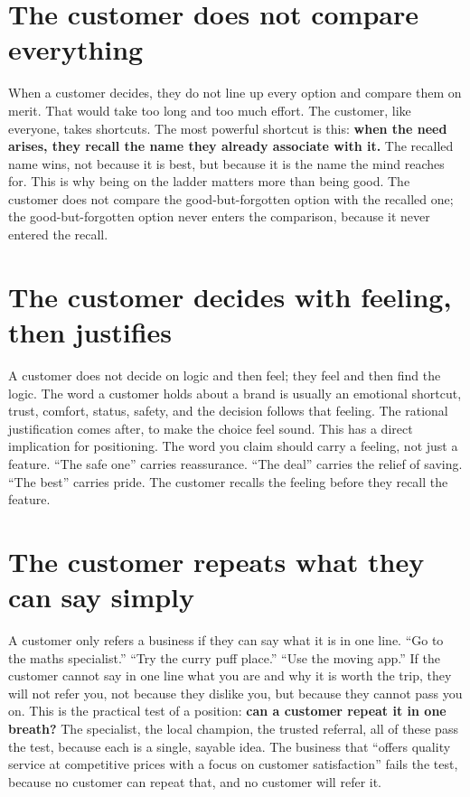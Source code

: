 \documentclass[10pt,twoside,openany]{memoir}
\newcommand{\needspacehead}{\needspace{4\baselineskip}}
\let\oldsection\section
\renewcommand{\section}{\needspacehead\oldsection}
\begin{document}
\section{The customer does not compare
everything}\label{the-customer-does-not-compare-everything}

When a customer decides, they do not line up every option and compare
them on merit. That would take too long and too much effort. The
customer, like everyone, takes shortcuts. The most powerful shortcut is
this: \textbf{when the need arises, they recall the name they already
associate with it.} The recalled name wins, not because it is best, but
because it is the name the mind reaches for. This is why being on the
ladder matters more than being good. The customer does not compare the
good-but-forgotten option with the recalled one; the good-but-forgotten
option never enters the comparison, because it never entered the recall.

\section{The customer decides with feeling, then
justifies}\label{the-customer-decides-with-feeling-then-justifies}

A customer does not decide on logic and then feel; they feel and then
find the logic. The word a customer holds about a brand is usually an
emotional shortcut, trust, comfort, status, safety, and the decision
follows that feeling. The rational justification comes after, to make
the choice feel sound. This has a direct implication for positioning.
The word you claim should carry a feeling, not just a feature. ``The
safe one'' carries reassurance. ``The deal'' carries the relief of
saving. ``The best'' carries pride. The customer recalls the feeling
before they recall the feature.

\section{The customer repeats what they can say
simply}\label{the-customer-repeats-what-they-can-say-simply}

A customer only refers a business if they can say what it is in one
line. ``Go to the maths specialist.'' ``Try the curry puff place.''
``Use the moving app.'' If the customer cannot say in one line what you
are and why it is worth the trip, they will not refer you, not because
they dislike you, but because they cannot pass you on. This is the
practical test of a position: \textbf{can a customer repeat it in one
breath?} The specialist, the local champion, the trusted referral, all
of these pass the test, because each is a single, sayable idea. The
business that ``offers quality service at competitive prices with a
focus on customer satisfaction'' fails the test, because no customer can
repeat that, and no customer will refer it.
\end{document}
